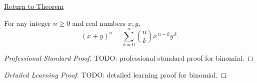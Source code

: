 \newpage
{}
\label{prf:binomial-theorem}

\begin{remark*}[Return]
\hyperref[thm:binomial-theorem]{Return to Theorem}
\end{remark*}

\begin{theorem*}
For any integer \(n \ge 0\) and real numbers \(x,y\),
\[
(x+y)^n
=
\sum_{k=0}^{n} \binom{n}{k} x^{\,n-k} y^{\,k}.
\]
\end{theorem*}

\begin{proof}[Professional Standard Proof]
\LRAProofBodyStart
TODO: professional standard proof for binomial.
\end{proof}

\begin{proof}[Detailed Learning Proof]
\LRAProofBodyStart
TODO: detailed learning proof for binomial.
\end{proof}

\begin{remark*}
\end{remark*}

\NoLocalDependencies

\clearpage
